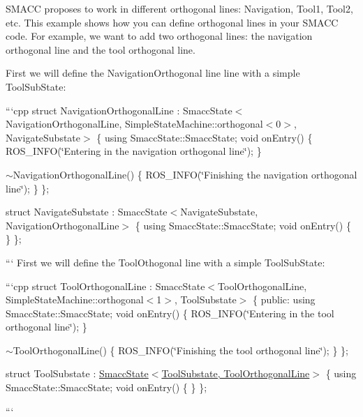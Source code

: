 S\-M\-A\-C\-C proposes to work in different orthogonal lines\-: Navigation, Tool1, Tool2, etc. This example shows how you can define orthogonal lines in your S\-M\-A\-C\-C code. For example, we want to add two orthogonal lines\-: the navigation orthogonal line and the tool orthogonal line.

 

First we will define the Navigation\-Orthogonal line line with a simple Tool\-Sub\-State\-:

```cpp struct Navigation\-Orthogonal\-Line \-: Smacc\-State$<$Navigation\-Orthogonal\-Line, Simple\-State\-Machine\-::orthogonal$<$0$>$, Navigate\-Substate$>$ \{ using Smacc\-State\-::\-Smacc\-State; void on\-Entry() \{ R\-O\-S\-\_\-\-I\-N\-F\-O(\char`\"{}\-Entering in the navigation orthogonal line\char`\"{}); \}

$\sim$\-Navigation\-Orthogonal\-Line() \{ R\-O\-S\-\_\-\-I\-N\-F\-O(\char`\"{}\-Finishing the navigation orthogonal line\char`\"{}); \} \};

struct Navigate\-Substate \-: Smacc\-State$<$\-Navigate\-Substate, Navigation\-Orthogonal\-Line$>$ \{ using Smacc\-State\-::\-Smacc\-State; void on\-Entry() \{ \} \};

``` First we will define the Tool\-Othogonal line with a simple Tool\-Sub\-State\-:

```cpp struct Tool\-Orthogonal\-Line \-: Smacc\-State$<$Tool\-Orthogonal\-Line, Simple\-State\-Machine\-::orthogonal$<$1$>$, Tool\-Substate$>$ \{ public\-: using Smacc\-State\-::\-Smacc\-State; void on\-Entry() \{ R\-O\-S\-\_\-\-I\-N\-F\-O(\char`\"{}\-Entering in the tool orthogonal line\char`\"{}); \}

$\sim$\-Tool\-Orthogonal\-Line() \{ R\-O\-S\-\_\-\-I\-N\-F\-O(\char`\"{}\-Finishing the tool orthogonal line\char`\"{}); \} \};

struct Tool\-Substate \-: \hyperlink{classsmacc_1_1SmaccState}{Smacc\-State$<$\-Tool\-Substate, Tool\-Orthogonal\-Line$>$} \{ using Smacc\-State\-::\-Smacc\-State; void on\-Entry() \{ \} \};

``` 